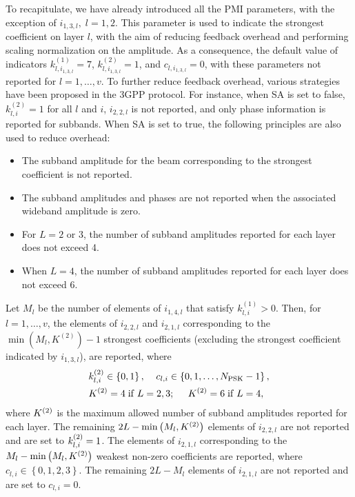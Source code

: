 \documentclass[lettersize,journal]{IEEEtran}
\begin{document}
To recapitulate, we have already introduced all the PMI parameters, with the exception of \(i_{1,3,l},\; l=1,2\). This parameter is used to indicate the strongest coefficient on layer \(l\), with the aim of reducing feedback overhead and performing scaling normalization on the amplitude. As a consequence, the default value of indicators $k_{l,{i_{1,3,l}}}^{{(1)}} = 7$, $k_{l,{i_{1,3,l}}}^{{(2)}} = 1$, and ${c_{l,i{}_{1,3,l}}} = 0$, with these parameters not reported for $l = 1, \ldots ,v $.
To further reduce feedback overhead, various strategies have been proposed in the 3GPP protocol. For instance,  when SA is set to false, \(k_{l,i}^{(2)} = 1\) for all \(l\) and \(i\), \({i_{2,2,l}}\) is not reported, and only phase information is reported for subbands. When SA is set to true, the following principles are also used to reduce overhead:
\begin{itemize}
  \item The subband amplitude for the beam corresponding to the strongest coefficient is not reported.
  \item The subband amplitudes and phases are not reported when the associated wideband amplitude is zero.
  \item For \(L=2\) or \(3\), the number of subband amplitudes reported for each layer does not exceed 4.
  \item When \(L=4\), the number of subband amplitudes reported for each layer does not exceed 6.
\end{itemize}
Let ${M_l}$ be the number of elements of ${i_{1,4,l}}$ that satisfy $k_{l,i}^{{(1)}} > 0$. Then, for $l = 1, \ldots ,v$, the elements of ${i_{2,2,l}}$ and ${i_{2,1,l}}$ corresponding to the $\min \left( {{M_l},{K^{(2)}}} \right) - 1$ strongest coefficients (excluding the strongest coefficient indicated by ${i_{1,3,l}}$), are reported, where
\begin{equation}
\begin{aligned}
&k_{l,i}^{{\rm{(2)}}} \in \left\{ {0,1} \right\},\;\;\;\;{c_{l,i}} \in \left\{ {0,1, \ldots ,{N_{{\rm{PSK}}}} - 1} \right\},\\
&{K^{{\rm{(2)}}}} = 4\;{\rm{if }}\;L = 2,3;\;\;\;\;\;{K^{{\rm{(2)}}}} = 6\;{\rm{if }}\;L = 4,
\end{aligned}
\end{equation}
where ${K^{{\rm{(2)}}}}$ is the maximum allowed number of subband amplitudes reported for each layer. The remaining $2L - \min \left( {{M_l},{K^{{\rm{(2)}}}}} \right)$ elements of ${i_{2,2,l}}$ are not reported and are set to $k_{l,i}^{{\rm{(2)}}} = 1$. The elements of ${i_{2,1,l}}$ corresponding to the ${M_l} - \min \left( {{M_l},{K^{{\rm{(2)}}}}} \right)$ weakest non-zero coefficients are reported, where ${c_{l,i}} \in \left\{ {0,1,2,3} \right\}$. The remaining $2L - {M_l}$ elements of ${i_{2,1,l}}$ are not reported and are set to ${c_{l,i}} = 0$. 
\end{document}

